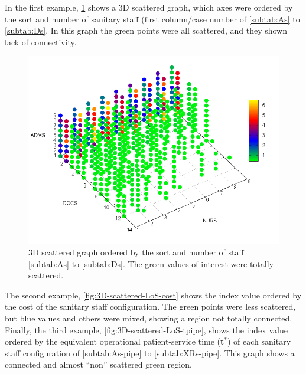 \documentclass[11pt]{article} %
\begin{document}
 In the first example, \ref{fig:3D-scattered-LoS-wo} shows a 3D scattered
graph, which axes were ordered by the sort and number of sanitary
staff (first column/case number of \ref{subtab:As} to \ref{subtab:Ds}.
In this graph the green points were all scattered, and they shown
lack of connectivity. 
\begin{figure}[H]
\noindent \centering{}\includegraphics[width=0.88\columnwidth,height=0.2\paperheight]{figs4/3D-scatter-LoS-wo2}\caption{3D scattered graph ordered by the sort and number of staff \ref{subtab:As}
to \ref{subtab:Ds}. The green values of interest were totally scattered.
\label{fig:3D-scattered-LoS-wo}}
\end{figure}
 The second example, \ref{fig:3D-scattered-LoS-cost} shows the index
value ordered by the cost of the sanitary staff configuration. The
green points were less scattered, but blue values and others were
mixed, showing a region not totally connected. Finally, the third
example, \ref{fig:3D-scattered-LoS-tpipe}, shows the index value
ordered by the equivalent operational patient-service time ({\bf t$^*$})
of each sanitary staff configuration of \ref{subtab:As-pipe} to \ref{subtab:XRs-pipe}.
This graph shows a connected and almost ``non'' scattered green
region. %

\end{document}
